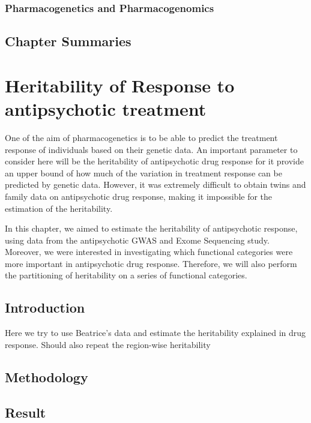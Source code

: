 \documentclass[12pt]{book}
\begin{document}
	\subsection{Pharmacogenetics and Pharmacogenomics}
	
	\section{Chapter Summaries}
	
	
	

	\chapter{Heritability of Response to antipsychotic treatment}
	One of the aim of pharmacogenetics is to be able to predict the treatment response of individuals based on their genetic data.
	An important parameter to consider here will be the heritability of antipsychotic drug response for it provide an upper bound of how much of the variation in treatment response can be predicted by genetic data. 
	However, it was extremely difficult to obtain twins and family data on antipsychotic drug response, making it impossible for the estimation of the heritability.
	
	In this chapter, we aimed to estimate the heritability of antipsychotic response, using data from the antipsychotic \gls{GWAS} and Exome Sequencing study. 
	Moreover, we were interested in investigating which functional categories were more important in antipsychotic drug response. 
	Therefore, we will also perform the partitioning of heritability on a series of functional categories.
	
	\section{Introduction}
	Here we try to use Beatrice's data and estimate the heritability explained in drug response.
	Should also repeat the region-wise heritability
	\section{Methodology}
	\section{Result}
\end{document}
